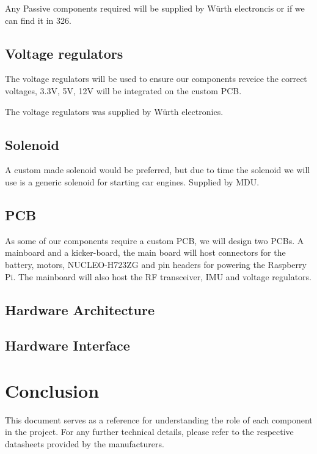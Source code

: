 \documentclass[a4paper,12pt]{article}
\begin{document}
  Any Passive components required will be supplied by Würth electroncis
  or if we can find it in 326.

  \subsection*{Voltage regulators}

  The voltage regulators will be used to ensure our components reveice
  the correct voltages, 3.3V, 5V, 12V will be integrated on the custom
  PCB.

  The voltage regulators was supplied by Würth electronics.

  \subsection*{Solenoid}

  A custom made solenoid would be preferred, but due to time the
  solenoid we will use is a generic solenoid for starting car engines.
  Supplied by MDU.

  \subsection*{PCB}

  As some of our components require a custom PCB, we will design two
  PCBs. A mainboard and a kicker-board, the main board will host
  connectors for the battery, motors, NUCLEO-H723ZG and pin headers for
  powering the Raspberry Pi. The mainboard will also host the RF
  transceiver, IMU and voltage regulators.

  \subsection{Hardware Architecture}

  \subsection{Hardware Interface}

  \section*{Conclusion}

  This document serves as a reference for understanding the role of each
  component in the project. For any further technical details, please
  refer to the respective datasheets provided by the manufacturers.

   
\end{document}

